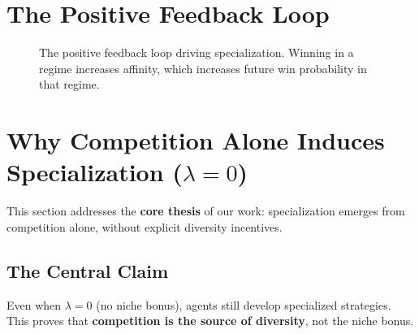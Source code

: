 \documentclass[11pt,a4paper]{article}
\theoremstyle{definition}
\theoremstyle{plain}
\begin{document}
\section{The Positive Feedback Loop}

\begin{figure}[h]
\centering
{}
\caption{The positive feedback loop driving specialization. Winning in a regime increases affinity, which increases future win probability in that regime.}
\end{figure}

\section{Why Competition Alone Induces Specialization ($\lambda = 0$)}
\label{sec:lambda-zero}

This section addresses the \textbf{core thesis} of our work: specialization emerges from competition alone, without explicit diversity incentives.

\subsection{The Central Claim}

\begin{keypoint}
Even when $\lambda = 0$ (no niche bonus), agents still develop specialized strategies. This proves that \textbf{competition is the source of diversity}, not the niche bonus.
\end{keypoint}
\end{document}

